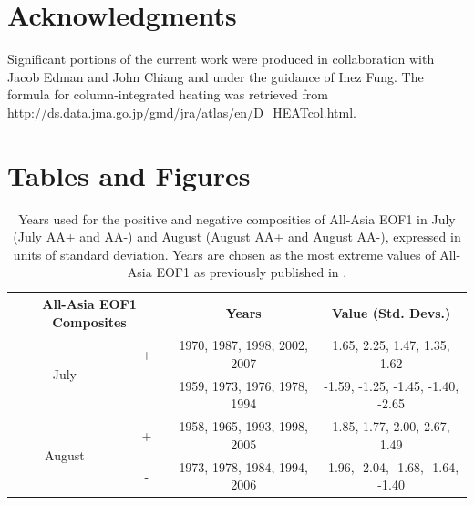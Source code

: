 	
\section{Acknowledgments}

	Significant portions of the current work were produced in collaboration with Jacob Edman and John Chiang and under the guidance of Inez Fung. The formula for column-integrated heating was retrieved from \url{http://ds.data.jma.go.jp/gmd/jra/atlas/en/D_HEATcol.html}.


\newpage	
\clearpage	
\section{Tables and Figures}


\begin{table}[p]

\caption{Years used for the positive and negative composities of All-Asia EOF1 in July (July AA+ and AA-) and August (August AA+ and August AA-), expressed in units of standard deviation. Years are chosen as the most extreme values of All-Asia EOF1 as previously published in \citet{Day2015}.}
\centering

\begin{tabular}{ c c c c}
	 	 		\multicolumn{2}{c}{All-Asia EOF1 Composites} 	&			Years				&		Value (Std. Devs.)			\tabularnewline	
				\hline
	 \multirow{2}{*}{July} 		&  +							&	1970, 1987, 1998, 2002, 2007 	&	1.65, 2.25, 1.47, 1.35, 1.62		\tabularnewline
	 						&  -							&	1959, 1973, 1976, 1978, 1994       &	-1.59, -1.25, -1.45, -1.40, -2.65	\tabularnewline
	 \multirow{2}{*}{August}	&  + 							&	1958, 1965, 1993, 1998, 2005	&	1.85, 1.77, 2.00, 2.67, 1.49		\tabularnewline
	 						&  -  							&	1973, 1978, 1984, 1994, 2006	&	-1.96, -2.04, -1.68, -1.64, -1.40 \tabularnewline

\end{tabular}
\label{tab:t41}
\end{table}

